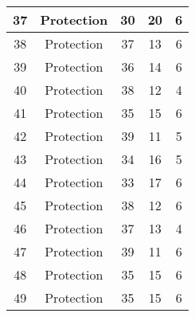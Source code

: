 \documentclass[results.tex]{subfiles}
\begin{document}
\begin{center}
\begin{tabular}{| c || c | c | c | c |}
            \hline
            37                      & Protection                   & 30                     & 20                      & 6                    \\
            \hline
            38                      & Protection                   & 37                     & 13                      & 6                    \\
            \hline
            39                      & Protection                   & 36                     & 14                      & 6                    \\
            \hline
            40                      & Protection                   & 38                     & 12                      & 4                    \\
            \hline
            41                      & Protection                   & 35                     & 15                      & 6                    \\
            \hline
            42                      & Protection                   & 39                     & 11                      & 5                    \\
            \hline
            43                      & Protection                   & 34                     & 16                      & 5                    \\
            \hline
            44                      & Protection                   & 33                     & 17                      & 6                    \\
            \hline
            45                      & Protection                   & 38                     & 12                      & 6                    \\
            \hline
            46                      & Protection                   & 37                     & 13                      & 4                    \\
            \hline
            47                      & Protection                   & 39                     & 11                      & 6                    \\
            \hline
            48                      & Protection                   & 35                     & 15                      & 6                    \\
            \hline
            49                      & Protection                   & 35                     & 15                      & 6                    \\
            \hline
        \end{tabular}
    \end{center}
\end{document}
